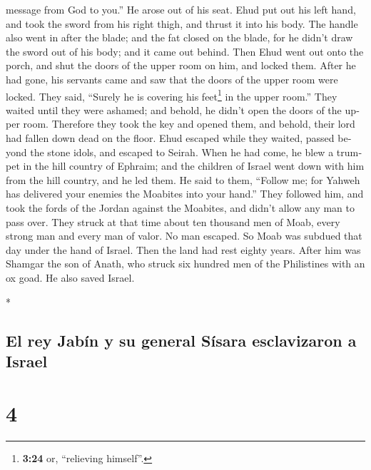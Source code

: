 \begin{paracol}{2}
\begin{otherlanguage}{english}
message from God to you.'' He arose out of his seat. 
Ehud put out his left hand, and took the sword from his right thigh, and
thrust it into his body.  The handle also went in after
the blade; and the fat closed on the blade, for he didn't draw the sword
out of his body; and it came out behind.  Then Ehud went
out onto the porch, and shut the doors of the upper room on him, and
locked them.  After he had gone, his servants came and
saw that the doors of the upper room were locked. They said, ``Surely he
is covering his feet\footnote{\textbf{3:24} or, ``relieving himself''.}
in the upper room.''  They waited until they were
ashamed; and behold, he didn't open the doors of the upper room.
Therefore they took the key and opened them, and behold, their lord had
fallen down dead on the floor.  Ehud escaped while they
waited, passed beyond the stone idols, and escaped to Seirah.
 When he had come, he blew a trumpet in the hill country
of Ephraim; and the children of Israel went down with him from the hill
country, and he led them.  He said to them, ``Follow me;
for Yahweh has delivered your enemies the Moabites into your hand.''
They followed him, and took the fords of the Jordan against the
Moabites, and didn't allow any man to pass over.  They
struck at that time about ten thousand men of Moab, every strong man and
every man of valor. No man escaped.  So Moab was subdued
that day under the hand of Israel. Then the land had rest eighty years.
 After him was Shamgar the son of Anath, who struck six
hundred men of the Philistines with an ox goad. He also saved Israel.

\end{otherlanguage}

\switchcolumn[0]*

\hypertarget{el-rey-jabuxedn-y-su-general-suxedsara-esclavizaron-a-israel}{%
\subsection{El rey Jabín y su general Sísara esclavizaron a
Israel}\label{el-rey-jabuxedn-y-su-general-suxedsara-esclavizaron-a-israel}}

\hypertarget{section-6}{%
\section{4}\label{section-6}}


\end{paracol}
